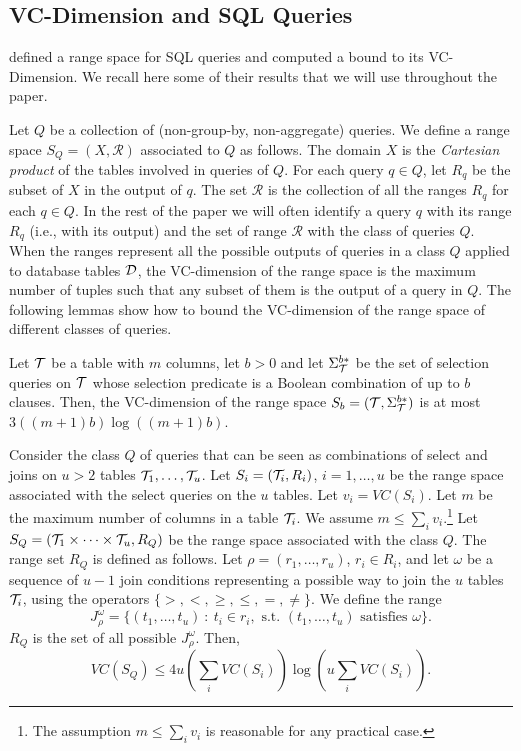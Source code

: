 \subsection{VC-Dimension and SQL Queries}\label{sec:vcdimquer}
\citet{RiondatoACZU11} defined a range space for SQL queries and computed a
bound to its VC-Dimension. We recall here some of their results that we will use
throughout the paper.

Let $Q$ be a collection of (non-group-by, non-aggregate) queries. We define a
range space $S_Q=(X,\mathcal{R})$ associated to $Q$ as follows. The domain $X$
is the \emph{Cartesian product} of the tables involved in queries of $Q$. For
each query $q\in Q$, let $R_q$ be the subset of $X$ in the output of $q$. The
set $\mathcal{R}$ is the collection of all the ranges $R_q$ for each $q\in Q$.
In the rest of the paper we will often identify a query $q$ with its range $R_q$
(i.e., with its output) and the set of range $\mathcal{R}$ with the class of
queries $Q$. When the ranges represent all the possible outputs of queries in a class $Q$
applied to database tables ${\cal D}$, the VC-dimension of the range space is the maximum
number of tuples such that any subset of them is the output of a query in $Q$.
The following lemmas show how to bound the VC-dimension of the
range space of different classes of queries.

\begin{lemma}\label{lem:vcdimselgen}
  Let ${\cal T}$ be a table with $m$ columns, let $b>0$ and let $\Sigma^{b*}_{\cal T}$
  be the set of selection queries on ${\cal T}$ whose selection predicate is a
  Boolean combination of up to $b$ clauses. Then, the VC-dimension of the range
  space $S_b = ({\cal T}, \Sigma^{b*}_{\cal T})$ is at most $3((m+1)b)\log((m+1)b)$.  
\end{lemma}

\begin{lemma}\label{lem:vcdimjoinmul}
  Consider the class $Q$ of queries that can be seen as combinations of select
  and joins on $u>2$ tables ${\cal T}_1,\dotsc,{\cal T}_u$. Let $S_i=({\cal T}_i,R_i)$,
  $i=1,\dotsc,u$ be the range space associated with the select queries on the $u$
  tables. Let $v_i=VC(S_i)$. Let $m$ be the maximum number of columns in a table
  ${\cal T}_i$. We assume $m\le \sum_i v_i$.\footnote{The assumption $m\le \sum_i
  v_i$ is reasonable for any practical case.} Let $S_Q = ({\cal T}_1\times\dotsb\times
  {\cal T}_u, R_Q)$ be the range space associated with the class $Q$. The range set
  $R_Q$ is defined as follows. Let $\rho = (r_1,\dotsc,r_u)$, $r_i\in R_i$, and
  let $\omega$ be a sequence of
  $u-1$ join conditions representing a possible way to join the $u$ tables ${\cal T}_i$,
  using the operators $\{>,<,\ge,\le,=,\neq\}$. We define the range 
  \[
  J^\omega_{\rho} = \{(t_1,\dotsc,t_u) ~:~ t_i\in r_i, \mbox{ s.t. }
  (t_1,\dotsc,t_u) \mbox{ satisfies } \omega\}.\]
  $R_Q$ is the set of all possible $J^\omega_{\rho}$. Then,
  \[
  VC(S_Q)\leq 4u(\sum_i VC(S_i))\log(u\sum_i VC(S_i)).
  \]
\end{lemma}

